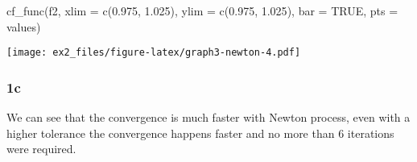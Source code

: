 \documentclass[
]{article}
\newenvironment{Shaded}{\begin{snugshade}}{\end{snugshade}}
\newcommand{\AttributeTok}[1]{\textcolor[rgb]{0.77,0.63,0.00}{#1}}
\newcommand{\ConstantTok}[1]{\textcolor[rgb]{0.00,0.00,0.00}{#1}}
\newcommand{\FloatTok}[1]{\textcolor[rgb]{0.00,0.00,0.81}{#1}}
\newcommand{\FunctionTok}[1]{\textcolor[rgb]{0.00,0.00,0.00}{#1}}
\newcommand{\NormalTok}[1]{#1}
\begin{document}
\begin{Shaded}
\begin{Highlighting}[]
\FunctionTok{cf\_func}\NormalTok{(f2, }\AttributeTok{xlim =} \FunctionTok{c}\NormalTok{(}\FloatTok{0.975}\NormalTok{, }\FloatTok{1.025}\NormalTok{), }\AttributeTok{ylim =} \FunctionTok{c}\NormalTok{(}\FloatTok{0.975}\NormalTok{, }\FloatTok{1.025}\NormalTok{), }\AttributeTok{bar =} \ConstantTok{TRUE}\NormalTok{, }\AttributeTok{pts =}\NormalTok{ values)}
\end{Highlighting}
\end{Shaded}

\texttt{[image: ex2\_files/figure-latex/graph3-newton-4.pdf]}

\hypertarget{c}{%
\subsubsection{1c}\label{c}}

We can see that the convergence is much faster with Newton process, even
with a higher tolerance the convergence happens faster and no more than
6 iterations were required.
\end{document}
